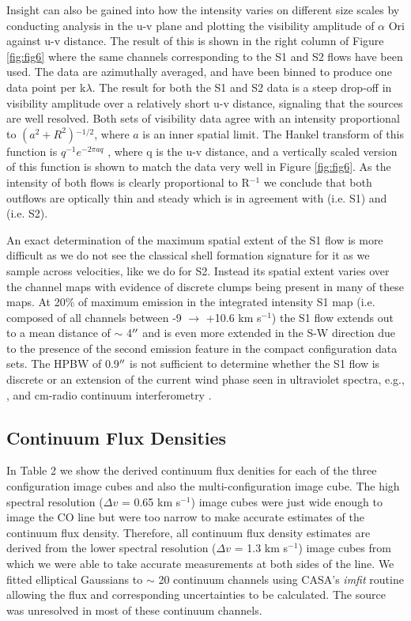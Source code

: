 \documentclass[iop]{emulateapj}
\begin{document}
Insight can also be gained into how the intensity varies on different size scales by conducting analysis in the u-v plane and plotting the visibility amplitude of $\alpha$ Ori against u-v distance. The result of this is shown in the right column of Figure \ref{fig:fig6} where the same channels corresponding to the S1 and S2 flows have been used. The data are azimuthally averaged, and have been binned to produce one data point per k$\lambda$. The result for both the S1 and S2 data is a steep drop-off in visibility amplitude over a relatively short u-v distance, signaling that the sources are well resolved. Both sets of visibility data agree with an intensity proportional to $(a^2 + R^2){}^{-1/2}$, where $a$ is an inner spatial limit. The Hankel transform of this function is $q^{-1}e^{-2\pi aq}$ \citep{2000fta..book.....B}, where q is the u-v distance, and a vertically scaled version of this function is shown to match the data very well in Figure \ref{fig:fig6}. As the intensity of both flows is clearly proportional to R${}^{-1}$ we conclude that both outflows are  optically thin and steady which is in agreement with \cite{2009AJ....137.3558S} (i.e. S1) and \cite{2002A&A...386.1009P} (i.e. S2). 

An exact determination of the maximum spatial extent of the S1 flow is more difficult as we do not see the classical shell formation signature for it as we sample across velocities, like we do for S2. Instead its spatial extent varies over the channel maps with evidence of discrete clumps being present in many of these maps. At 20\% of maximum emission in the integrated intensity S1 map (i.e. composed of all channels between -9 $\rightarrow$ +10.6 km s${}^{-1}$) the S1 flow extends out to a mean distance of $\sim$ 4$\mbox{$^{\prime\prime}$}$ and is even more extended in the S-W direction due to the presence of the second emission feature in the compact configuration data sets. The HPBW of 0.9$\mbox{$^{\prime\prime}$}$ is not sufficient to determine whether the S1 flow is discrete or an extension of the current wind phase seen in ultraviolet spectra, e.g., \cite{1997ApJ...479..970C}, and cm-radio continuum interferometry \citep{1998Natur.392..575L, harper_2001}.

\subsection{Continuum Flux Densities} \label{results4} 

In Table 2 we show the derived continuum flux denities for each of the three configuration image cubes and also the multi-configuration image cube. The high spectral resolution ($\Delta v$ = 0.65 km s${}^{-1}$) image cubes were just wide enough to image the CO line but were too narrow to make accurate estimates of the continuum flux density. Therefore, all continuum flux density estimates are derived from the lower spectral resolution ($\Delta v$ = 1.3 km s${}^{-1}$) image cubes from which we were able to take accurate measurements at both sides of the line. We fitted elliptical Gaussians to $\sim$ 20 continuum channels using CASA's \textit{imfit} routine allowing the flux and corresponding uncertainties to be calculated. The source was unresolved in most of these continuum channels. 
\end{document}
